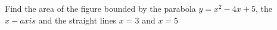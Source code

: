 
%
%
%
%
% 
% 

\question Find the area of the figure bounded by the parabola $y=x^2-4x+5$,
the $x-axis$ and the straight lines $x=3$ and $x=5$

\insertQR{}

